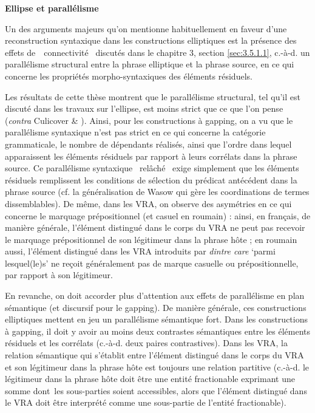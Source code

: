 {\bfseries
Ellipse et parallélisme}

Un des arguments majeurs qu'on mentionne habituellement en faveur d'une reconstruction syntaxique dans les constructions elliptiques est la présence des effets de~{\guillemotleft}~connectivité~{\guillemotright} discutés dans le chapitre 3, section \ref{sec:3.5.1.1}, c.-à-d. un parallélisme structural entre la phrase elliptique et la phrase source, en ce qui concerne les propriétés morpho-syntaxiques des éléments résiduels. 

Les résultats de cette thèse montrent que le parallélisme structural, tel qu'il est discuté dans les travaux sur l'ellipse, est moins strict que ce que l'on pense (\textit{contra} Culicover \& \citet{Jackendoff2005}). Ainsi, pour les constructions à gapping, on a vu que le parallélisme syntaxique n'est pas strict en ce qui concerne la catégorie grammaticale, le nombre de dépendants réalisés, ainsi que l'ordre dans lequel apparaissent les éléments résiduels par rapport à leurs corrélats dans la phrase source. Ce parallélisme syntaxique {\guillemotleft}~relâché~{\guillemotright} exige simplement que les éléments résiduels remplissent les conditions de sélection du prédicat antécédent dans la phrase source (cf. la généralisation de Wasow qui gère les coordinations de termes dissemblables). De même, dans les VRA, on observe des asymétries en ce qui concerne le marquage prépositionnel (et casuel en roumain) : ainsi, en français, de manière générale, l'élément distingué dans le corps du VRA ne peut pas recevoir le marquage prépositionnel de son légitimeur dans la phrase hôte ; en roumain aussi, l'élément distingué dans les VRA introduits par \textit{dintre care} `parmi lesquel(le)s' ne reçoit généralement pas de marque casuelle ou prépositionnelle, par rapport à son légitimeur.

En revanche, on doit accorder plus d'attention aux effets de parallélisme en plan sémantique (et discursif pour le gapping). De manière générale, ces constructions elliptiques mettent en jeu un parallélisme sémantique fort. Dans les constructions à gapping, il doit y avoir au moins deux contrastes sémantiques entre les éléments résiduels et les corrélats (c.-à-d. deux paires contrastives). Dans les VRA, la relation sémantique qui s'établit entre l'élément distingué dans le corps du VRA et son légitimeur dans la phrase hôte est toujours une relation partitive (c.-à-d. le légitimeur dans la phrase hôte doit être une entité fractionable exprimant une somme dont~les sous-parties soient accessibles, alors que l'élément distingué dans le VRA doit être interprété comme une sous-partie de l'entité fractionable). 

